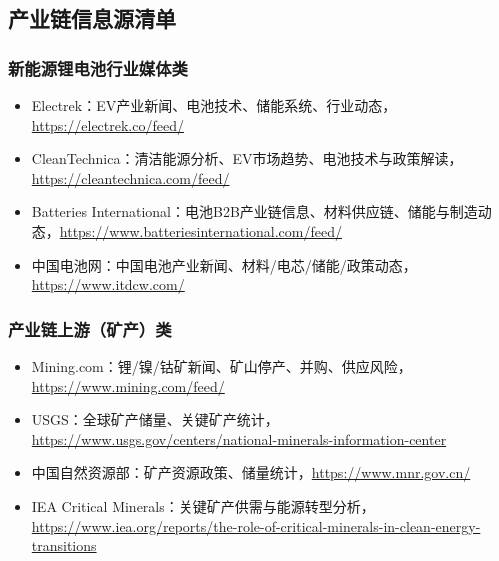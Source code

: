 \documentclass[12pt,a4paper]{article}
\begin{document}
\subsection{产业链信息源清单}
\subsubsection{新能源锂电池行业媒体类}
\begin{itemize}
    \item Electrek：EV产业新闻、电池技术、储能系统、行业动态，\url{https://electrek.co/feed/}
    \item CleanTechnica：清洁能源分析、EV市场趋势、电池技术与政策解读，\url{https://cleantechnica.com/feed/}
    \item Batteries International：电池B2B产业链信息、材料供应链、储能与制造动态，\url{https://www.batteriesinternational.com/feed/}
    \item 中国电池网：中国电池产业新闻、材料/电芯/储能/政策动态，\url{https://www.itdcw.com/}
\end{itemize}

\subsubsection{产业链上游（矿产）类}
\begin{itemize}
    \item Mining.com：锂/镍/钴矿新闻、矿山停产、并购、供应风险，\url{https://www.mining.com/feed/}
    \item USGS：全球矿产储量、关键矿产统计，\url{https://www.usgs.gov/centers/national-minerals-information-center}
    \item 中国自然资源部：矿产资源政策、储量统计，\url{https://www.mnr.gov.cn/}
    \item IEA Critical Minerals：关键矿产供需与能源转型分析，\url{https://www.iea.org/reports/the-role-of-critical-minerals-in-clean-energy-transitions}
\end{itemize}
\end{document}
